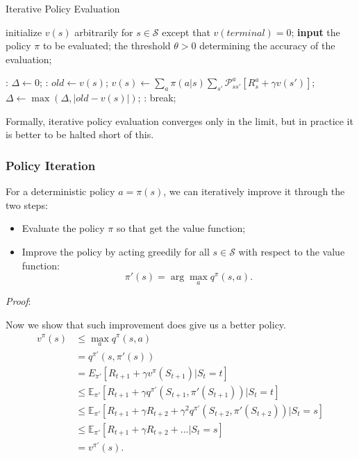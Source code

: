 \documentclass{progartcn}
\begin{document}
		\begin{algorithm}[H]
		\caption{Iterative Policy Evaluation}
		\label{alg: Iterative Policy Evaluation}
		\begin{algorithmic}[1]
			\State initialize $v(s)$ arbitrarily for $s\in\mathcal{S}$ except that $v(terminal)=0$;
			\State \textbf{input} the policy $\pi$ to be evaluated; the threshold $\theta>0$ determining the accuracy of the evaluation; 

			:
				\State $\Delta\gets 0$;
				:
					\State $old\gets v(s)$;
					\State $v(s)\gets\sum_{a}\pi(a|s)\sum_{s'}\mathcal{P}_{ss'}^a[R_s^a+\gamma v(s')]$;
					\State $\Delta\gets\max(\Delta,|old-v(s)|)$;
				\EndFor
				\If {$\Delta<\theta$}:
					\State break;
				\EndIf
        	\EndFor
		\end{algorithmic}
		\end{algorithm}

        Formally, iterative policy evaluation converges only in the limit, but in practice it is better to be halted short of this.\\

	\subsubsection{Policy Iteration}
		\label{sec: PI}

		For a deterministic policy $a =\pi(s)$, we can iteratively improve it through the two steps:
		\begin{itemize}[noitemsep,topsep=0pt]
			\item Evaluate the policy $\pi$ so that get the value function;
			\item Improve the policy by acting greedily for all $s\in\mathcal{S}$ with respect to the value function:
			\[\pi'(s)=\arg\max_{a}q^\pi(s,a).\]
		\end{itemize}

		\textit{Proof}:

		Now we show that such improvement does give us a better policy.
		\begin{align*}
		v^\pi(s)&\le \max_{a}q^\pi(s,a)\\
		&=q^{\pi'}(s,\pi'(s))\\
		&=E_{\pi'}[R_{t+1}+\gamma v^\pi(S_{t+1})|S_t=t]\\
		&\le \mathbb{E}_{\pi'}[R_{t+1}+\gamma q^{\pi'}(S_{t+1},\pi'(S_{t+1}))|S_t=t]\\
		&\le \mathbb{E}_{\pi'}[R_{t+1}+\gamma R_{t+2}+\gamma^2q^{\pi'}(S_{t+2},\pi'(S_{t+2}))|S_t=s]\tag{1}\\
		&\le \mathbb{E}_{\pi'}[R_{t+1}+\gamma R_{t+2}+...|S_t=s]\\
		&=v^{\pi'}(s).
		\end{align*}
\end{document}

